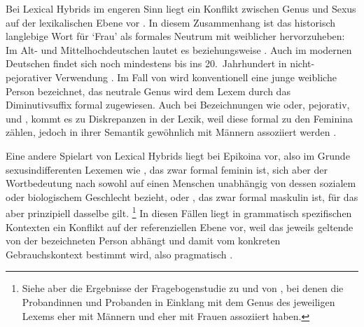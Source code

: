 Bei Lexical Hybrids im engeren Sinn liegt ein Konflikt
zwischen Genus und Sexus auf der lexikalischen Ebene vor
\autocite[145]{klein2022}. In diesem Zusammenhang ist das
historisch langlebige Wort für `Frau' als formales Neutrum mit
weiblicher  hervorzuheben: Im Alt- und
Mittelhochdeutschen lautet es  beziehungsweise
. Auch im modernen Deutschen findet sich 
noch mindestens bis ins 20.~Jahrhundert in nicht-pejorativer Verwendung
\autocite[166]{fleischer2012}. Im Fall von  wird
konventionell eine junge weibliche Person bezeichnet, das
neutrale Genus wird dem Lexem durch das Diminutivsuffix  formal
zugewiesen. Auch bei Bezeichnungen wie  oder, pejorativ,  und , kommt es zu Diskrepanzen in der Lexik, weil diese
formal zu den Feminina zählen, jedoch in ihrer Semantik gewöhnlich mit Männern
assoziiert werden \autocite[vgl.~auch][67--68]{panther2009}.

\label{phsec:epikoina}

Eine andere Spielart von Lexical Hybrids liegt bei Epikoina vor, also im Grunde
sexus\-indifferenten Lexemen wie , das zwar
formal feminin ist, sich aber der Wortbedeutung nach sowohl auf einen Menschen
unabhängig von dessen sozialem oder biologischem
Geschlecht bezieht, oder , das zwar formal maskulin ist, für das
aber prinzipiell dasselbe gilt.%
%
	\footnote{Siehe aber die Ergebnisse der Fragebogenstudie zu
		 und  von \citet[174--183]{klein2022}, bei denen
		die Probandinnen und Probanden in Einklang mit dem Genus des jeweiligen
		Lexems  eher mit Männern und  eher mit Frauen
		assoziiert haben.}
%
In diesen Fällen liegt in grammatisch spezifischen Kontexten ein Konflikt auf
der referenziellen Ebene vor, weil das jeweils geltende  von
der bezeichneten Person abhängt und damit vom konkreten
Gebrauchskontext bestimmt wird, also pragmatisch
\autocite[142--144]{klein2022}.

